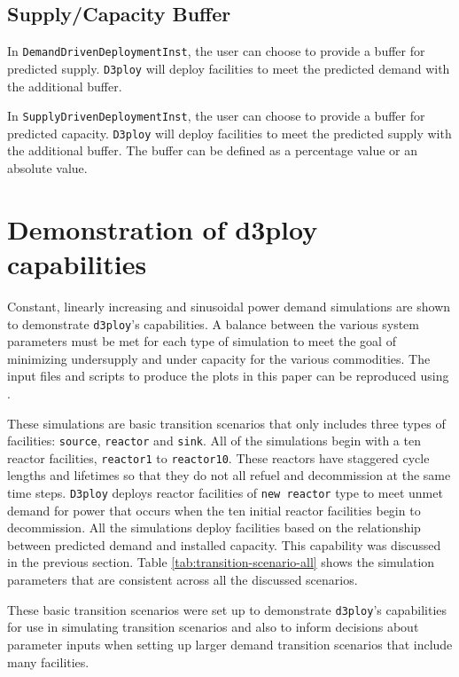 \documentclass{anstrans}
\newcommand{\deploy}{\texttt{d3ploy}\xspace}%
\newcommand{\Deploy}{\texttt{D3ploy}\xspace}%
\begin{document}
\subsection{\textbf{Supply/Capacity Buffer}}
In \texttt{DemandDrivenDeploymentInst}, the user can choose to provide a
buffer for predicted supply.
\Deploy will deploy facilities to meet the predicted demand with the 
additional buffer. 

In \texttt{SupplyDrivenDeploymentInst}, the user can choose to 
provide a buffer for predicted capacity.
\Deploy will deploy facilities to meet the predicted supply with the 
additional buffer. 
The buffer can be defined as a percentage value or an absolute value.  


\section{Demonstration of d3ploy capabilities}
Constant, linearly increasing and sinusoidal power demand simulations
are shown to demonstrate \deploy's capabilities. 
A balance between the various system parameters must be 
met for each type of simulation to meet the goal of 
minimizing undersupply and under capacity for the various 
commodities. 
The input files and scripts to produce the plots in this paper 
can be reproduced using \cite{d3ploy_doi_2019}. 

These simulations are basic transition scenarios that only includes 
three types of facilities: \texttt{source}, \texttt{reactor} and 
\texttt{sink}.
All of the simulations begin with a ten reactor facilities, 
\texttt{reactor1} to \texttt{reactor10}. 
These reactors have staggered cycle lengths and lifetimes 
so that they do not all refuel and decommission at the same time 
steps. 
\Deploy deploys reactor facilities of \texttt{new reactor} type
to meet unmet demand for power that occurs when the ten initial 
reactor facilities begin to decommission. 
All the simulations deploy facilities based on the relationship
between predicted demand and installed capacity. 
This capability was discussed in the previous section.  
Table \ref{tab:transition-scenario-all} shows the simulation 
parameters that are consistent across all the discussed 
scenarios. 

These basic transition scenarios were set up to 
demonstrate \deploy's capabilities for use in simulating 
transition scenarios and 
also to inform decisions about parameter inputs when setting up larger 
demand transition scenarios that include many facilities. 
\end{document}
